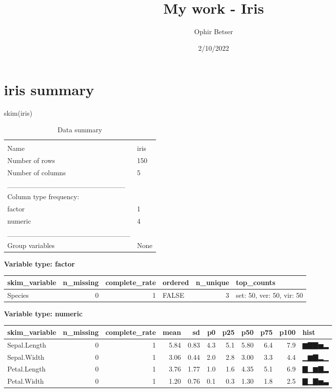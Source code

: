 \documentclass[
]{article}
\title{My work - Iris}
\author{Ophir Betser}
\date{2/10/2022}
\newenvironment{Shaded}{\begin{snugshade}}{\end{snugshade}}
\newcommand{\FunctionTok}[1]{\textcolor[rgb]{0.00,0.00,0.00}{#1}}
\newcommand{\NormalTok}[1]{#1}
\begin{document}
\maketitle

\hypertarget{iris-summary}{%
\section{iris summary}\label{iris-summary}}

\begin{Shaded}
\begin{Highlighting}[]
\FunctionTok{skim}\NormalTok{(iris)}
\end{Highlighting}
\end{Shaded}

\begin{longtable}[]{@{}ll@{}}
\caption{Data summary}\tabularnewline
\toprule
& \\
\midrule
\endfirsthead
\toprule
& \\
\midrule
\endhead
Name & iris \\
Number of rows & 150 \\
Number of columns & 5 \\
\_\_\_\_\_\_\_\_\_\_\_\_\_\_\_\_\_\_\_\_\_\_\_ & \\
Column type frequency: & \\
factor & 1 \\
numeric & 4 \\
\_\_\_\_\_\_\_\_\_\_\_\_\_\_\_\_\_\_\_\_\_\_\_\_ & \\
Group variables & None \\
\bottomrule
\end{longtable}

\textbf{Variable type: factor}

\begin{longtable}[]{@{}lrrlrl@{}}
\toprule
skim\_variable & n\_missing & complete\_rate & ordered & n\_unique &
top\_counts \\
\midrule
\endhead
Species & 0 & 1 & FALSE & 3 & set: 50, ver: 50, vir: 50 \\
\bottomrule
\end{longtable}

\textbf{Variable type: numeric}

\begin{longtable}[]{@{}lrrrrrrrrrl@{}}
\toprule
skim\_variable & n\_missing & complete\_rate & mean & sd & p0 & p25 &
p50 & p75 & p100 & hist \\
\midrule
\endhead
Sepal.Length & 0 & 1 & 5.84 & 0.83 & 4.3 & 5.1 & 5.80 & 6.4 & 7.9 &
▆▇▇▅▂ \\
Sepal.Width & 0 & 1 & 3.06 & 0.44 & 2.0 & 2.8 & 3.00 & 3.3 & 4.4 &
▁▆▇▂▁ \\
Petal.Length & 0 & 1 & 3.76 & 1.77 & 1.0 & 1.6 & 4.35 & 5.1 & 6.9 &
▇▁▆▇▂ \\
Petal.Width & 0 & 1 & 1.20 & 0.76 & 0.1 & 0.3 & 1.30 & 1.8 & 2.5 &
▇▁▇▅▃ \\
\bottomrule
\end{longtable}
\end{document}
